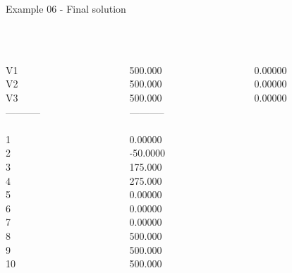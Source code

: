 \begin{frame}{Example 06 - Final solution}
\footnotesize
{} \\
  \\

\begin{columns}[t]
\begin{column}{0.3\textwidth}
\\
V1\\
V2\\
V3\\
-----------\\
\\
1\\
2\\
3\\
4\\
5\\
6\\
7\\
8\\
9\\
10\\

\end{column}
\begin{column}{0.3\textwidth}
\\
500.000\\
500.000\\
500.000\\
-----------\\
\\
0.00000\\
-50.0000\\
175.000\\
275.000\\
0.00000\\
0.00000\\
0.00000\\
500.000\\
500.000\\
500.000\\
\end{column}

\begin{column}{0.3\textwidth}
\\
0.00000\\
0.00000\\
0.00000\\


\end{column}
\end{columns}
\end{frame}
